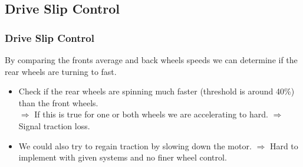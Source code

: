\documentclass{beamer}
\begin{document}
\subsection{Drive Slip Control}
\begin{frame}
    \frametitle{Drive Slip Control}
    By comparing the fronts average and back wheels speeds we can determine if the rear wheels are turning to fast. 
    \begin{itemize}
     \item Check if the rear wheels are spinning much faster (threshold is around 40\%) than the front wheels.\\
     $\Rightarrow$ If this is true for one or both wheels we are accelerating to hard.
     $\Rightarrow$ Signal traction loss.
     \pause
     \item We could also try to regain traction by slowing down the motor.
     $\Rightarrow$ Hard to implement with given systems and no finer wheel control. \\
     \pause
    \end{itemize}
\end{frame}
\end{document}
